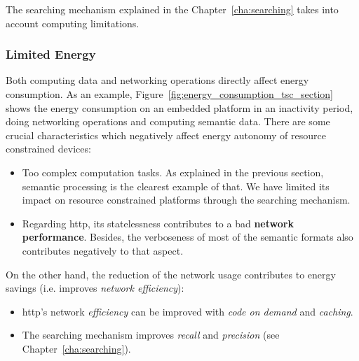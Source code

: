 The searching mechanism explained in the Chapter~\ref{cha:searching} takes into account computing limitations.



\subsubsection{Limited Energy}

Both computing data and networking operations directly affect energy consumption.
As an example, Figure~\ref{fig:energy_consumption_tsc_section} shows the energy consumption on an embedded platform in an inactivity period, doing networking operations and computing semantic data. %
There are some crucial characteristics which negatively affect energy autonomy of resource constrained devices:
\begin{itemize}
  \item Too complex computation tasks.
        As explained in the previous section, semantic processing is the clearest example of that.
        We have limited its impact on resource constrained platforms through the searching mechanism.
  \item Regarding \ac{http}, its statelessness contributes to a bad \textbf{network performance}.
        Besides, the verboseness of most of the semantic formats also contributes negatively to that aspect.
\end{itemize}




On the other hand, the reduction of the network usage contributes to energy savings (i.e. improves \emph{network efficiency}):
\begin{itemize}
  \item \ac{http}'s network \emph{efficiency} can be improved with \emph{code on demand} and \emph{caching}.
  \item The searching mechanism improves \emph{recall} and \emph{precision} (see Chapter~\ref{cha:searching}).
\end{itemize}





